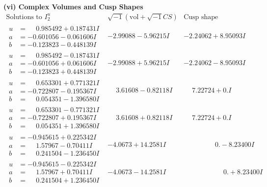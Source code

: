 \documentclass[1p]{elsarticle_modified}
\theoremstyle{definition}
\newcommand{\I}{\sqrt{-1}}
\begin{document}
\newpage\flushleft \textbf{(vi) Complex Volumes and Cusp Shapes}
$$\begin{array}{c|c|c}  
\text{Solutions to }I^u_{2}& \I (\text{vol} + \sqrt{-1}CS) & \text{Cusp shape}\\
 \hline 
\begin{aligned}
u &= \phantom{-}0.985492 + 0.187431 I \\
a &= -0.601056 - 0.061606 I \\
b &= -0.123823 - 0.448139 I\end{aligned}
 & -2.99088 - 5.96215 I & -2.24062 + 8.95093 I \\ \hline\begin{aligned}
u &= \phantom{-}0.985492 - 0.187431 I \\
a &= -0.601056 + 0.061606 I \\
b &= -0.123823 + 0.448139 I\end{aligned}
 & -2.99088 + 5.96215 I & -2.24062 - 8.95093 I \\ \hline\begin{aligned}
u &= \phantom{-}0.653301 + 0.771321 I \\
a &= -0.722807 - 0.195367 I \\
b &= \phantom{-}0.054351 - 1.396580 I\end{aligned}
 & \phantom{-}3.61608 - 0.82118 I & \phantom{-}7.22724 + 0. I\phantom{ +0.000000I} \\ \hline\begin{aligned}
u &= \phantom{-}0.653301 - 0.771321 I \\
a &= -0.722807 + 0.195367 I \\
b &= \phantom{-}0.054351 + 1.396580 I\end{aligned}
 & \phantom{-}3.61608 + 0.82118 I & \phantom{-}7.22724 + 0. I\phantom{ +0.000000I} \\ \hline\begin{aligned}
u &= -0.945615 + 0.225342 I \\
a &= \phantom{-}1.57967 - 0.70411 I \\
b &= \phantom{-}0.241504 - 1.236450 I\end{aligned}
 & -4.0673 + 14.2581 I & \phantom{-0.000000 } 0. - 8.23400 I \\ \hline\begin{aligned}
u &= -0.945615 - 0.225342 I \\
a &= \phantom{-}1.57967 + 0.70411 I \\
b &= \phantom{-}0.241504 + 1.236450 I\end{aligned}
 & -4.0673 - 14.2581 I & \phantom{-0.000000 -}0. + 8.23400 I \\ \hline\begin{aligned}

\end{aligned}
\end{array}$$
\end{document}
